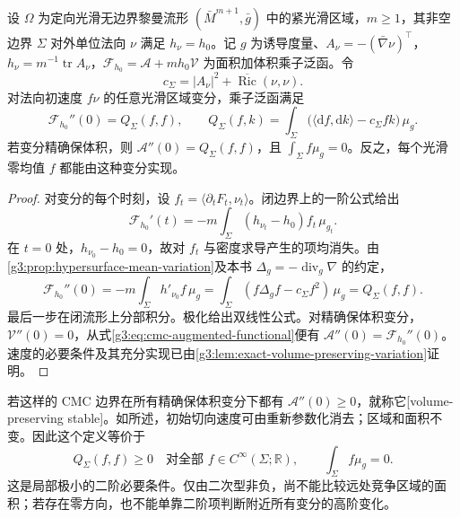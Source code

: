 \begin{theorem}\label{g3:thm:cmc-volume-second-variation}
	设 \(\Omega\) 为定向光滑无边界黎曼流形 \((\bar M^{m+1},\bar g)\) 中的紧光滑区域，\(m\ge1\)，其非空边界 \(\Sigma\) 对外单位法向 \(\nu\) 满足 \(h_\nu=h_0\)。记 \(g\) 为诱导度量、\(A_\nu=-(\bar\nabla\nu)^\top\)，\(h_\nu=m^{-1}\operatorname{tr}A_\nu\)，\(\mathcal F_{h_0}=\mathcal A+m h_0\mathcal V\) 为面积加体积乘子泛函。令
	\[
		c_\Sigma=|A_\nu|^2+\overline{\operatorname{Ric}}(\nu,\nu).
	\]
	对法向初速度 \(f\nu\) 的任意光滑区域变分，乘子泛函满足
	\begin{equation}\label{g3:eq:cmc-volume-index-form}
		\mathcal F_{h_0}''(0)=Q_\Sigma(f,f),
		\qquad Q_\Sigma(f,k)=\int_\Sigma
		\bigl(\langle\mathrm df,\mathrm dk\rangle-c_\Sigma f k\bigr)\,\mu_g.
	\end{equation}
	若变分精确保体积，则 \(\mathcal A''(0)=Q_\Sigma(f,f)\)，且 \(\int_\Sigma f\mu_g=0\)。反之，每个光滑零均值 \(f\) 都能由这种变分实现。
\end{theorem}
\begin{proof}
	对变分的每个时刻，设 \(f_t=\langle\partial_tF_t,\nu_t\rangle\)。闭边界上的一阶公式给出
	\[
		\mathcal F_{h_0}'(t)
		=-m\int_\Sigma(h_{\nu_t}-h_0)f_t\,\mu_{g_t}.
	\]
	在 \(t=0\) 处，\(h_{\nu_0}-h_0=0\)，故对 \(f_t\) 与密度求导产生的项均消失。由\cref{g3:prop:hypersurface-mean-variation}及本书 \(\Delta_g=-\operatorname{div}_g\nabla\) 的约定，
	\[
		\mathcal F_{h_0}''(0)
		=-m\int_\Sigma h'_{\nu_0}f\,\mu_g
		=\int_\Sigma(f\Delta_g f-c_\Sigma f^2)\,\mu_g
		=Q_\Sigma(f,f).
	\]
	最后一步在闭流形上分部积分。极化给出双线性公式。对精确保体积变分，\(\mathcal V''(0)=0\)，从式\eqref{g3:eq:cmc-augmented-functional}便有 \(\mathcal A''(0)=\mathcal F_{h_0}''(0)\)。速度的必要条件及其充分实现已由\cref{g3:lem:exact-volume-preserving-variation}证明。
\end{proof}

若这样的 CMC 边界在所有精确保体积变分下都有 \(\mathcal A''(0)\ge0\)，就称它[volume-preserving stable]。如所述，初始切向速度可由重新参数化消去；区域和面积不变。因此这个定义等价于
\begin{equation}\label{g3:eq:cmc-stability-mean-zero}
	Q_\Sigma(f,f)\ge0
	\quad\text{对全部 }f\in C^\infty(\Sigma;\mathbb R),
	\qquad \int_\Sigma f\mu_g=0.
\end{equation}
这是局部极小的二阶必要条件。仅由二次型非负，尚不能比较远处竞争区域的面积；若存在零方向，也不能单靠二阶项判断附近所有变分的高阶变化。

\ProseParagraphBreak


